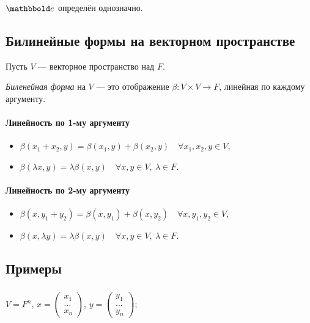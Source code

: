 \begin{exercise}
    $\E$ определён однозначно.
\end{exercise}


\subsection{Билинейные формы на векторном пространстве}

Пусть $V$ --- векторное пространство над $F$.

\begin{definition}
    \textit{Биленейная форма} на $V$ --- это отображение $\beta : V \times V \to F$, линейная по каждому аргументу.
\end{definition}

\paragraph{Линейность по 1-му аргументу}
\begin{itemize}[nosep]
\item $\beta(x_1 + x_2, y) = \beta(x_1, y) + \beta(x_2, y) \quad \forall x_1, x_2, y \in V$,
\item $\beta(\lambda x, y) = \lambda\beta(x, y) \quad \forall x, y \in V, \ \lambda \in F$.
\end{itemize}

\paragraph{Линейность по 2-му аргументу}
\begin{itemize}[nosep]
\item $\beta(x, y_1 + y_2) = \beta(x, y_1) + \beta(x, y_2) \quad \forall x, y_1, y_2 \in V$,
\item $\beta(x, \lambda y) = \lambda\beta(x, y) \quad \forall x, y \in V, \ \lambda \in F$.
\end{itemize}


\subsection{Примеры}

\subsubsection{}

$V = F^n$, $x = \begin{pmatrix} x_1 \\ \dots \\ x_n \end{pmatrix}$, $y = \begin{pmatrix} y_1 \\ \dots \\ y_n \end{pmatrix}$;

